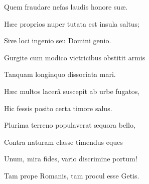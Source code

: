 {Quem fraudare nefas laudis honore suæ.

Hæc proprios nuper tutata est insula saltus;

Sive loci ingenio seu Domini genio.

Gurgite cum modico victricibus obstitit armis

Tanquam longinquo dissociata mari.

Hæc multos lacerâ suscepit ab urbe fugatos,

Hic fessis posito certa timore salus.

Plurima terreno populaverat æquora bello,

Contra naturam classe timendus eques

Unum, mira fides, vario discrimine portum!

Tam prope Romanis, tam procul esse Getis.

}
